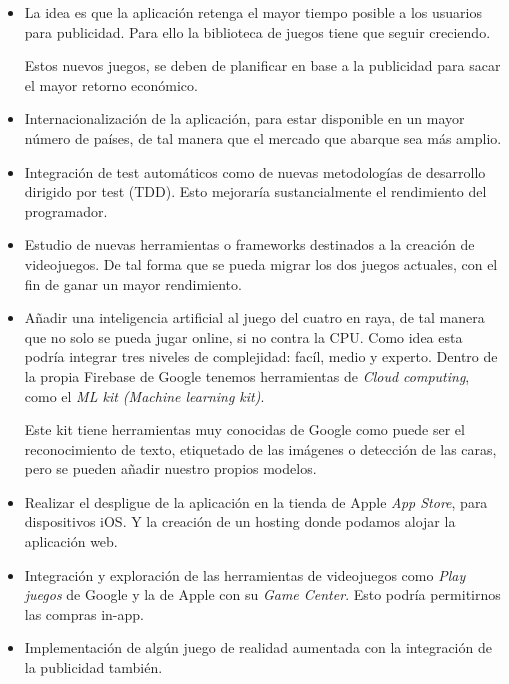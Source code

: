 \begin{itemize}
\item La idea es que la aplicación retenga el mayor tiempo posible a los usuarios para publicidad. Para ello la biblioteca de juegos tiene que seguir creciendo. 

Estos nuevos juegos, se deben de planificar en base a la publicidad para sacar el mayor retorno económico.

\item Internacionalización de la aplicación, para estar disponible en un mayor número de países, de tal manera que el mercado que abarque sea más amplio.

\item Integración de test automáticos como de nuevas metodologías de desarrollo dirigido por test (TDD). Esto mejoraría sustancialmente el rendimiento del programador.

\item Estudio de nuevas herramientas o frameworks destinados a la creación de videojuegos. De tal forma que se pueda migrar los dos juegos actuales, con el fin de ganar un mayor rendimiento.

\item Añadir una inteligencia artificial al juego del cuatro en raya, de tal manera que no solo se pueda jugar online, si no contra la CPU. Como idea esta podría integrar tres niveles de complejidad: facíl, medio y experto. Dentro de la propia Firebase de Google tenemos herramientas de \emph{Cloud computing}, como el \emph{ML kit (Machine learning kit)}. 

Este kit tiene herramientas muy conocidas de Google como puede ser el reconocimiento de texto, etiquetado de las imágenes o detección de las caras, pero se pueden añadir nuestro propios modelos.

\item Realizar el despligue de la aplicación en la tienda de Apple \emph{App Store}, para dispositivos iOS. Y la creación de un hosting donde podamos alojar la aplicación web.
	
\item Integración y exploración de las herramientas de videojuegos como \emph{Play juegos} de Google y la de Apple con su \emph{Game Center}. Esto podría permitirnos las compras in-app.

\item Implementación de algún juego de realidad aumentada con la integración de la publicidad también.
\end{itemize}